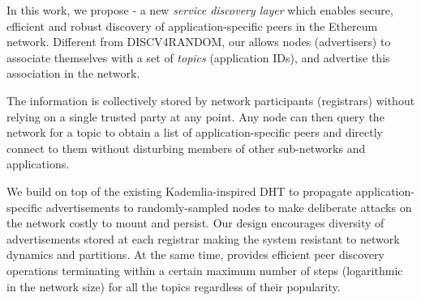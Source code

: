 

 In this work, we propose \sysname - a new \textit{service discovery layer} which enables secure, efficient and robust discovery of application-specific peers in the Ethereum network.
Different from DISCV4RANDOM, our \sysname allows nodes (\ie advertisers) to associate themselves with a set of \emph{topics} (\eg application IDs), and advertise this association in the network. 

The information is collectively stored by network participants (\ie registrars) without relying on a single trusted party at any point. Any node can then query the network for a topic to obtain a list of application-specific peers and directly connect to them without disturbing members of other sub-networks and applications. 

We build \sysname on top of the existing Kademlia-inspired DHT to propagate application-specific advertisements to randomly-sampled nodes to make deliberate attacks on the network costly to mount and persist. Our design encourages diversity of advertisements stored at each registrar making the system resistant to network dynamics and partitions. At the same time, \sysname provides efficient peer discovery operations terminating within a certain maximum number of steps (logarithmic in the network size) for all the topics regardless of their popularity. 

